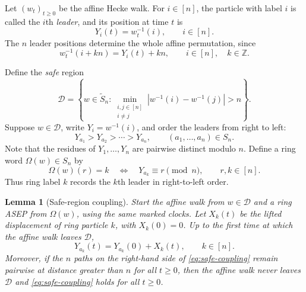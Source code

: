\documentclass[11pt,a4paper]{amsart}
\newtheorem{lemma}[theorem]{Lemma}
\theoremstyle{definition}
\theoremstyle{remark}
\numberwithin{equation}{section}
\newcommand{\Z}{\mathbb Z}
\newcommand{\wtS}{\widetilde S_n}
\newcommand{\cD}{\mathcal D}
\newcommand{\abs}[1]{\left|#1\right|}
\begin{document}
	Let $(w_t)_{t\ge0}$ be the affine Hecke walk.  For $i\in[n]$, the particle
	with label $i$ is called the $i$th \emph{leader}, and its position at time $t$ is
	\begin{equation}\label{eq:leader-position}
		Y_i(t)=w_t^{-1}(i),
		\qquad i\in[n].
	\end{equation}
	The $n$ leader positions determine the whole affine permutation, since
	\begin{equation}\label{eq:leader-class-periodicity}
		w_t^{-1}(i+kn)=Y_i(t)+kn,
		\qquad i\in[n],\quad k\in\Z.
	\end{equation}
	
	Define the \textit{safe} region
	\begin{equation}\label{eq:safe-region}
		\cD=\left\{w\in\wtS:
		\min_{\substack{i,j\in[n]\\i\ne j}}
		\abs{w^{-1}(i)-w^{-1}(j)}>n\right\}.
	\end{equation}
	Suppose $w\in\cD$, write $Y_i=w^{-1}(i)$, and order the leaders from right
	to left:
	\begin{equation}\label{eq:right-to-left-order}
		Y_{a_1}>Y_{a_2}>\cdots>Y_{a_n},
		\qquad (a_1,\ldots,a_n)\in S_n.
	\end{equation}
	Note that the residues of $Y_1,\ldots,Y_n$ are pairwise distinct modulo $n$.  Define a ring word
	$\Omega(w)\in S_n$ by
	\begin{equation}\label{eq:safe-ring-word}
		\Omega(w)(r)=k
		\quad\Longleftrightarrow\quad
		Y_{a_k}\equiv r\pmod n,
		\qquad r,k\in[n].
	\end{equation}
	Thus ring label $k$ records the $k$th leader in right-to-left order.
	
	\begin{lemma}[Safe-region coupling]\label{lem:safe-region-coupling}
		Start the affine walk from $w\in\cD$ and a ring ASEP from $\Omega(w)$, using
		the same marked clocks.  Let $X_k(t)$ be the lifted displacement of ring
		particle $k$, with $X_k(0)=0$.  Up to the first time at which the affine walk
		leaves $\cD$,
		\begin{equation}\label{eq:safe-coupling}
			Y_{a_k}(t)=Y_{a_k}(0)+X_k(t),
			\qquad k\in[n].
		\end{equation}
		Moreover, if the $n$ paths on the right-hand side of
		\eqref{eq:safe-coupling} remain pairwise at distance greater than $n$ for all
		$t\ge0$, then the affine walk never leaves $\cD$ and
		\eqref{eq:safe-coupling} holds for all $t\ge0$.
	\end{lemma}
	
\end{document}
